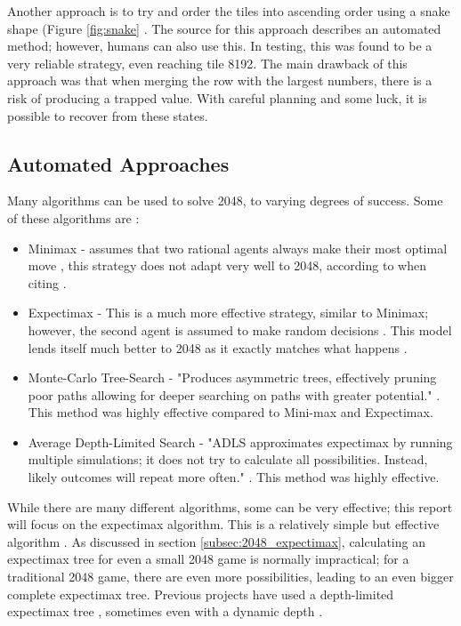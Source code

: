 \documentclass{article}
\begin{document}
Another approach is to try and order the tiles into ascending order using a snake shape (Figure \ref{fig:snake} \cite{aiplays2048}. The source for this approach describes an automated method; however,
humans can also use this. In testing, this was found to be a very reliable strategy, even reaching tile 8192. The main drawback of this approach was that when merging the row with the largest numbers, there is a risk of producing a trapped value. With careful planning and some luck, it is possible to recover from these states.
\subsection{Automated Approaches}
\label{subsec:automated_techniques}
Many algorithms can be used to solve 2048, to varying degrees of success. Some of these algorithms are \cite{approches2048}:
\begin{itemize}
    \item Minimax - assumes that two rational agents always make their most optimal move \cite{minmaxCS2910}, this strategy does not adapt very well to 2048, according to \cite{approches2048} when citing \cite{minmax2048}.
    \item Expectimax - This is a much more effective strategy, similar to Minimax; however, the second agent is assumed to make random decisions \cite[p.~200]{russell2010artificial}. This model lends itself much better to 2048 as it exactly matches what happens \cite{expectimax2048}.
    \item Monte-Carlo Tree-Search - "Produces asymmetric trees, effectively pruning poor paths allowing for deeper searching on paths with greater potential." \cite{approches2048}. This method was highly effective compared to Mini-max and Expectimax.
    \item Average Depth-Limited Search - "ADLS approximates expectimax by running multiple simulations; it does not try to calculate all possibilities. Instead, likely outcomes will repeat more often." \cite {approches2048}. This method was highly effective.
\end{itemize}
While there are many different algorithms, some can be very effective; this report will focus on the expectimax algorithm. This is a relatively simple but effective algorithm \cite{expectimax2048}. As discussed in section \ref{subsec:2048_expectimax}, calculating an expectimax tree for even a small 2048 game is normally impractical; for a traditional 2048 game, there are even more possibilities, leading to an even bigger complete expectimax tree. Previous projects have used a depth-limited expectimax tree \cite{aiplays2048}, sometimes even with a dynamic depth \cite{expectimax2048}.
\end{document}

